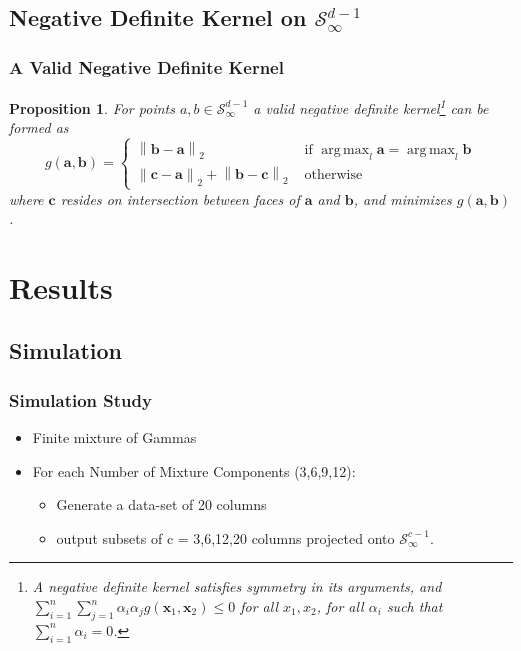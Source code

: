 \documentclass[aspectratio=169]{beamer}
\newcommand{\norm}[1]{\left\lVert #1 \right\rVert}
\newcommand{\pnorm}[2]{\norm{#1}_{#2}}
\newtheorem{prop}{Proposition}
\DeclareMathOperator*{\argmax}{arg\,max}
\begin{document}
\subsection{Negative Definite Kernel on $\mathcal{S}_{\infty}^{d-1}$}
\begin{frame}
  \frametitle{A Valid Negative Definite Kernel}
  \begin{prop}
    For points $a,b \in \mathcal{S}_{\infty}^{d-1}$ a valid negative definite kernel\footnote{A negative definite kernel satisfies symmetry in its arguments, and $\sum_{i = 1}^n\sum_{j = 1}^n \alpha_i\alpha_j g(\bm{x}_1,\bm{x}_2) \leq 0$ for all $x_1,x_2$, for all $\alpha_i$ such that $\sum_{i = 1}^n\alpha_i = 0$.} can be formed as
    \begin{equation*}
      g(\bm{a},\bm{b}) = \begin{cases}
        \pnorm{\bm{b}-\bm{a}}{2} &\text{ if }\argmax_l\bm{a} = \argmax_l\bm{b}\\
        \pnorm{\bm{c}-\bm{a}}{2} + \pnorm{\bm{b}-\bm{c}}{2} &\text{ otherwise}
      \end{cases}
    \end{equation*}
    where $\bm{c}$ resides on intersection between faces of $\bm{a}$ and $\bm{b}$, and
                minimizes $g(\bm{a},\bm{b})$.
  \end{prop}
\end{frame}



\section{Results}

\subsection{Simulation}

\begin{frame}
  \frametitle{Simulation Study}
  \begin{itemize}
    \item Finite mixture of Gammas
    \item For each Number of Mixture Components (3,6,9,12):
      \begin{itemize}
        \item Generate a data-set of 20 columns
        \item output subsets of c = 3,6,12,20 columns projected onto $\mathcal{S}_{\infty}^{c-1}$.
      \end{itemize}
  \end{itemize}
\end{frame}
\end{document}
